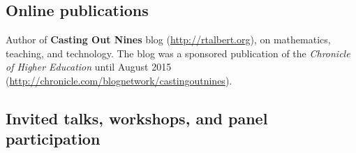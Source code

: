 \documentclass[letterpaper]{article}
\renewenvironment{itemize}{
  \begin{list}{}{
    \setlength{\leftmargin}{1.5em}
	\setlength{\itemsep}{0in}
  }
}{
  \end{list}
}
\begin{document}
\subsection*{Online publications}

\begin{itemize}
	\item Author of \textbf{Casting Out Nines} blog (\url{http://rtalbert.org}), on mathematics, teaching, and technology. The blog was a sponsored publication of the \emph{Chronicle of Higher Education} until August 2015 (\url{http://chronicle.com/blognetwork/castingoutnines}).
\end{itemize}


\subsection*{Invited talks, workshops, and panel participation}
\end{document}
